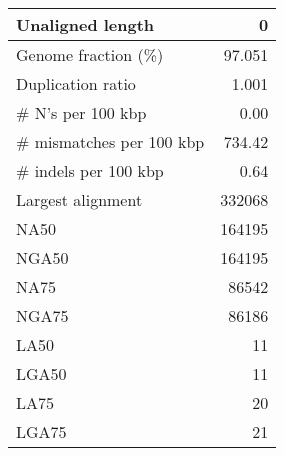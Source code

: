 \documentclass[12pt,a4paper]{article}
\begin{document}
\begin{table}[ht]
\begin{center}
\begin{tabular}{|l*{1}{|r}|}
Unaligned length & 0 \\ \hline
Genome fraction (\%) & 97.051 \\ \hline
Duplication ratio & 1.001 \\ \hline
\# N's per 100 kbp & 0.00 \\ \hline
\# mismatches per 100 kbp & 734.42 \\ \hline
\# indels per 100 kbp & 0.64 \\ \hline
Largest alignment & 332068 \\ \hline
NA50 & 164195 \\ \hline
NGA50 & 164195 \\ \hline
NA75 & 86542 \\ \hline
NGA75 & 86186 \\ \hline
LA50 & 11 \\ \hline
LGA50 & 11 \\ \hline
LA75 & 20 \\ \hline
LGA75 & 21 \\ \hline
\end{tabular}
\end{center}
\end{table}
\end{document}
